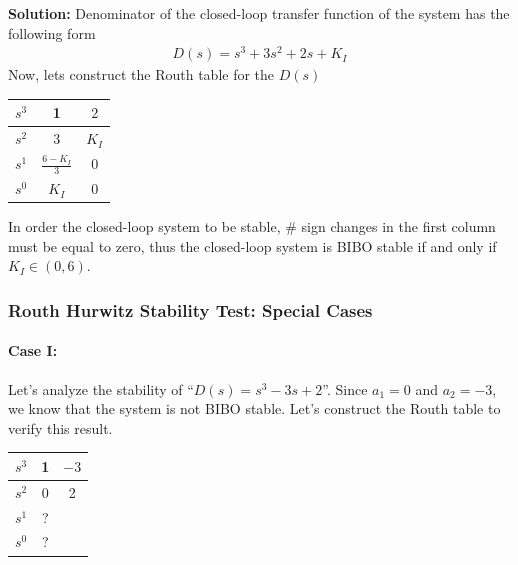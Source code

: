 \documentclass[twoside]{article}
\begin{document}
\textbf{Solution:} Denominator of the closed-loop transfer function 
of the system has the following form
%
\begin{align*}
D(s) = s^3 + 3 s^2 + 2 s + K_I 
\end{align*}
%
Now, lets construct the Routh table for the $D(s)$

 \begin{minipage}[h]{1\linewidth}
\begin{center}
\begin{tabular}{|c || c || c  |}
\hline
$s^3$ & 1 & $2$ 
\\ \hline
$s^2$ & 3 & $K_I$ 
\\ \hline
$s^1$ & $\frac{6 - K_I}{3}$ & 0 
\\ \hline
$s^0$ & $K_I$ & 0 
\\ \hline
\end{tabular}
\end{center}
  \end{minipage}

In order the closed-loop system to be stable, $\#$ sign changes in the
first column must be equal to zero, thus the closed-loop system is BIBO stable
if and only if $K_I \in (0 , 6)$.

\subsubsection{Routh Hurwitz Stability Test: Special Cases}

\paragraph{Case I:}

Let's analyze the stability of ``$D(s) = s^3 - 3 s + 2$''. 
Since $a_1 = 0$ and $a_2 = -3$, we know that the system
is not BIBO stable. Let's construct the Routh table to verify this result.

 \begin{minipage}[h]{1\linewidth}
\begin{center}
\begin{tabular}{|c || c || c  |}
\hline
$s^3$ & 1 & $-3$ 
\\ \hline
$s^2$ & 0 & 2
\\ \hline
$s^1$  & ? & 
\\ \hline
$s^0$  & ? & 
\\ \hline
\end{tabular}
\end{center}
  \end{minipage}
\end{document}
